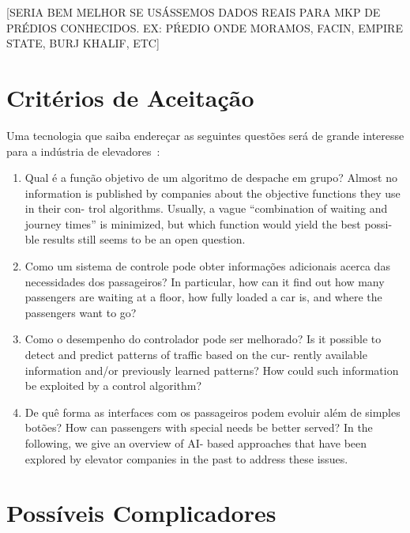 {\color{red}[SERIA BEM MELHOR SE USÁSSEMOS DADOS REAIS PARA MKP DE PRÉDIOS CONHECIDOS. EX: PŔEDIO ONDE MORAMOS, FACIN, EMPIRE STATE, BURJ KHALIF, ETC]} %

\section{Critérios de Aceitação}

Uma tecnologia que saiba endereçar as seguintes questões será de grande interesse para a indústria de elevadores~\cite{KOEHLEROTTIGER02}:

\begin{enumerate}
\item Qual é a função objetivo de um algoritmo de despache em grupo? \hfill \newline
      Almost no information is published by companies about the objective functions they use in their con- trol algorithms. Usually, a vague “combination of waiting and journey times” is minimized, but which function would yield the best possi- ble results still seems to be an open question.

\item Como um sistema de controle pode obter informações adicionais acerca das necessidades dos passageiros?\hfill \newline
      In particular, how can it find out how many passengers are waiting at a floor, how fully loaded a car is, and where the passengers want to go?

\item Como o desempenho do controlador pode ser melhorado? \hfill \newline
      Is it possible to detect and predict patterns of traffic based on the cur- rently available information and/or previously learned patterns? How could such information be exploited by a control algorithm?

\item De quê forma as interfaces com os passageiros podem evoluir além de simples botões? \hfill \newline
      How can passengers with special needs be better served? In the following, we give an overview of AI- based approaches that have been explored by elevator companies in the past to address these issues.
\end{enumerate}

\section{Possíveis Complicadores}

